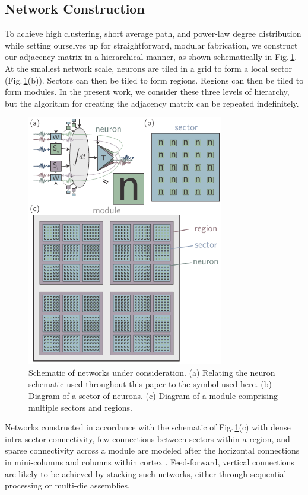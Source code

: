 \documentclass[twocolumn]{article}
\begin{document}
\subsection{\label{sec:networkConstruction}Network Construction}
To achieve high clustering, short average path, and power-law degree distribution while setting ourselves up for straightforward, modular fabrication, we construct our adjacency matrix in a hierarchical manner, as shown schematically in Fig.\,\ref{fig:networks_schematic}. At the smallest network scale, neurons are tiled in a grid to form a local sector (Fig.\,\ref{fig:networks_schematic}(b)). Sectors can then be tiled to form regions. Regions can then be tiled to form modules. In the present work, we consider these three levels of hierarchy, but the algorithm for creating the adjacency matrix can be repeated indefinitely. 
\begin{figure}[t!]
	\centerline{\includegraphics[width=8.6cm]{_networks_schematic_small.pdf}}
	\caption{\label{fig:networks_schematic}Schematic of networks under consideration. (a) Relating the neuron schematic used throughout this paper to the symbol used here. (b) Diagram of a sector of neurons. (c) Diagram of a module comprising multiple sectors and regions.}
\end{figure}
Networks constructed in accordance with the schematic of Fig.\,\ref{fig:networks_schematic}(c) with dense intra-sector connectivity, few connections between sectors within a region, and sparse connectivity across a module are modeled after the horizontal connections in mini-columns and columns within cortex \cite{mo1997,spto2000,brto2006,haah2017}. Feed-forward, vertical connections are likely to be achieved by stacking such networks, either through sequential processing or multi-die assemblies.
\end{document}
